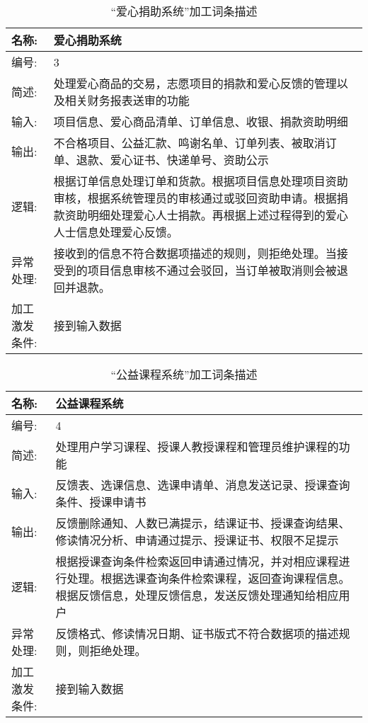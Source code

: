 \begin{table}[H]  
\caption{“爱心捐助系统”加工词条描述}  
\begin{center}  
    \begin{tabular}{l p{11cm}} 
        \hline
        \quad 名称:  &   爱心捐助系统 \\
        \hline
        \quad 编号:  & 3 \\
        \hline
        \quad 简述:  & 处理爱心商品的交易，志愿项目的捐款和爱心反馈的管理以及相关财务报表送审的功能 \\
        \hline
        \quad 输入:  & 项目信息、爱心商品清单、订单信息、收银、捐款资助明细 \\
        \hline
        \quad 输出:  & 不合格项目、公益汇款、鸣谢名单、订单列表、被取消订单、退款、爱心证书、快递单号、资助公示 \\
        \hline
        \quad 逻辑:  & 根据订单信息处理订单和货款。根据项目信息处理项目资助审核，根据系统管理员的审核通过或驳回资助申请。根据捐款资助明细处理爱心人士捐款。再根据上述过程得到的爱心人士信息处理爱心反馈。 \\
        \hline
        \quad 异常处理: & 接收到的信息不符合数据项描述的规则，则拒绝处理。当接受到的项目信息审核不通过会驳回，当订单被取消则会被退回并退款。\\ 
        \hline
        \quad 加工激发条件: & 接到输入数据 \\ 
        \hline
    \end{tabular}
    \label{tab1}
\end{center}
\end{table}

\begin{table}[H]  
\caption{“公益课程系统”加工词条描述}  
\begin{center}  
    \begin{tabular}{l p{11cm}} 
        \hline
        \quad 名称:  &   公益课程系统 \\
        \hline
        \quad 编号:  & 4 \\
        \hline
        \quad 简述:  & 处理用户学习课程、授课人教授课程和管理员维护课程的功能  \\
        \hline
        \quad 输入:  & 反馈表、选课信息、选课申请单、消息发送记录、授课查询条件、授课申请书 \\
        \hline
        \quad 输出:  & 反馈删除通知、人数已满提示，结课证书、授课查询结果、修读情况分析、申请通过提示、授课证书、权限不足提示 \\
        \hline
        \quad 逻辑:  & 根据授课查询条件检索返回申请通过情况，并对相应课程进行处理。根据选课查询条件检索课程，返回查询课程信息。根据反馈信息，处理反馈信息，发送反馈处理通知给相应用户 \\
        \hline
        \quad 异常处理: & 反馈格式、修读情况日期、证书版式不符合数据项的描述规则，则拒绝处理。\\ 
        \hline
        \quad 加工激发条件: & 接到输入数据 \\ 
        \hline
    \end{tabular}
    \label{tab1}
\end{center}
\end{table}

